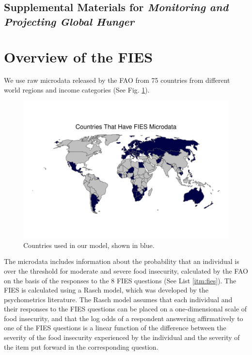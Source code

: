 \documentclass{article}
\begin{document}
\begin{center}
\section*{Supplemental Materials for \textit{Monitoring and Projecting Global Hunger}}
\end{center}
\setcounter{table}{0}
\setcounter{figure}{0}
\setcounter{section}{0}
\renewcommand{\thetable}{S\arabic{table}}
\renewcommand{\thefigure}{S\arabic{figure}}
\renewcommand{\thesection}{S\arabic{section}}

\section{Overview of the FIES}
We use raw microdata released by the FAO from 75 countries from different world regions and income categories (See Fig. \ref{fig:fies_countries}).

\begin{figure}[H]
  \centering
  \includegraphics[width=\linewidth]{img/FIES_Countries.pdf}
  \caption{Countries used in our model, shown in blue.}
  \label{fig:fies_countries}
\end{figure}

The microdata includes information about the probability that an individual is over the threshold for moderate and severe food insecurity, calculated by the FAO on the basis of the responses to the 8 FIES questions (See List \ref{itm:fies}).  The FIES is calculated using a Rasch model, which was developed by the psychometrics literature.  The Rasch model assumes that each individual and their responses to the FIES questions can be placed on a one-dimensional scale of food insecurity, and that the log odds of a respondent answering affirmatively to one of the FIES questions is a linear function of the difference between the severity of the food insecurity experienced by the individual and the severity of the item put forward in the corresponding question.
\end{document}
